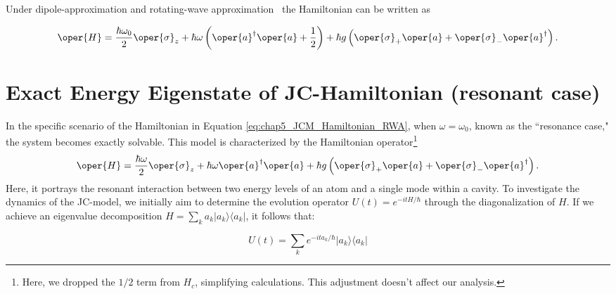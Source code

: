 Under dipole-approximation and rotating-wave approximation~\cite[Chap 2]{Bina_JC_tutorial} the Hamiltonian can be written as
\begin{mdframed}
\begin{equation}
        \label{eq:chap5_JCM_Hamiltonian_RWA}
        \oper{H} = \frac{\hbar \omega_0}{2} \oper{\sigma}_z + \hbar \omega \left(\oper{a}^\dagger \oper{a} + \frac{1}{2}\right) 
        + \hbar g \left(\oper{\sigma}_+ \oper{a} + \oper{\sigma}_- \oper{a}^\dagger\right).
\end{equation}
\end{mdframed}

\section[Exact Energy Eigenstate of JC-Hamiltonian]{Exact Energy Eigenstate of JC-Hamiltonian (resonant case)}

In the specific scenario of the Hamiltonian in Equation \ref{eq:chap5_JCM_Hamiltonian_RWA}, when 
\(\omega  = \omega_0\), known as the 
``resonance case," the system becomes exactly solvable.
This model is characterized by the Hamiltonian operator\footnote{Here, we dropped the \(1/2\) term from \(H_c\), 
simplifying calculations. This adjustment doesn't affect our analysis.}
\begin{equation}
        \label{eq:chap5_JCM_Hamiltonian_resonance}
        \oper{H} = \frac{\hbar\omega}{2} \oper{\sigma}_z + \hbar \omega \oper{a}^\dagger \oper{a}
        + \hbar g \left(\oper{\sigma}_+ \oper{a} + \oper{\sigma}_- \oper{a}^\dagger\right). 
\end{equation}
Here, it portrays the resonant interaction between two energy levels of an atom and a single mode within a cavity.
To investigate the dynamics of the JC-model, we initially aim to determine the evolution operator 
$U(t) = e^{-i t H/\hbar}$ through the diagonalization of $H$. If we achieve an eigenvalue decomposition 
$H = \sum_k a_k \lvert a_k \rangle \langle a_k \rvert$, it follows that:

\begin{equation}
U(t) = \sum_k e^{-i t a_k/\hbar} \lvert a_k \rangle \langle a_k \rvert
\end{equation}

